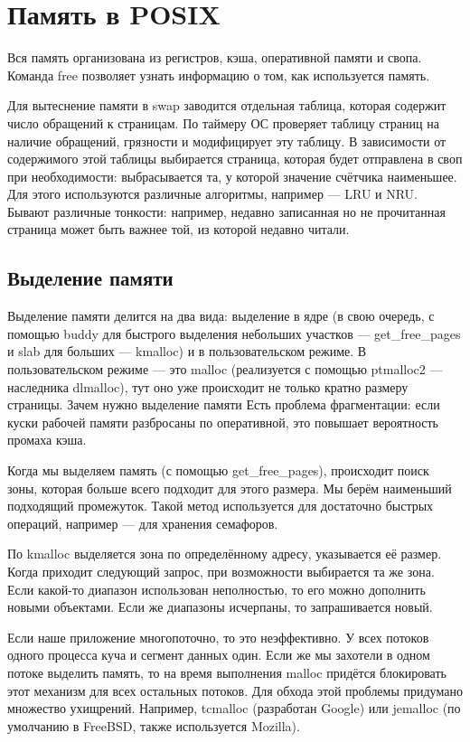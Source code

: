 \documentclass[main]{subfiles}
\begin{document}
\chapter{Память в POSIX}
Вся память организована из регистров, кэша, оперативной памяти и свопа.
Команда free позволяет узнать информацию о том, как используется
память.

Для вытеснение памяти в swap заводится отдельная таблица, которая
содержит число обращений к страницам. По таймеру ОС проверяет
таблицу страниц на наличие обращений, грязности и модифицирует
эту таблицу.
В зависимости от содержимого этой таблицы выбирается
страница, которая будет отправлена в своп при необходимости:
выбрасывается та, у которой значение счётчика наименьшее.
Для этого используются различные алгоритмы, например --- LRU и NRU.
Бывают различные тонкости: например, недавно записанная но не прочитанная
страница может быть важнее той, из которой недавно читали.

\section{Выделение памяти}
Выделение памяти делится на два вида: выделение в ядре (в свою очередь, с помощью
buddy для быстрого выделения небольших участков --- get\_free\_pages и slab для больших --- kmalloc) и
в пользовательском режиме. В пользовательском режиме --- это malloc
(реализуется с помощью ptmalloc2 --- наследника dlmalloc), тут оно уже происходит
не только кратно размеру страницы. Зачем нужно выделение памяти
Есть проблема фрагментации: если куски рабочей памяти разбросаны по оперативной, это
повышает вероятность промаха кэша.

Когда мы выделяем память (с помощью get\_free\_pages), происходит поиск зоны,
которая больше всего подходит для этого размера. Мы берём наименьший подходящий
промежуток.
Такой метод используется для
достаточно быстрых операций, например --- для хранения семафоров.

По kmalloc выделяется зона по определённому адресу, указывается её размер.
Когда приходит следующий запрос, при возможности выбирается та же зона.
Если какой-то диапазон использован неполностью, то его можно дополнить
новыми объектами. Если же диапазоны исчерпаны, то запрашивается новый.

Если наше приложение многопоточно, то это неэффективно. У всех потоков
одного процесса куча и сегмент данных один. Если же мы захотели в одном
потоке выделить память, то на время выполнения malloc придётся блокировать
этот механизм для всех остальных потоков. Для обхода этой проблемы придумано
множество ухищрений. Например, tcmalloc (разработан Google) или
jemalloc (по умолчанию в FreeBSD, также используется Mozilla).
\end{document}
